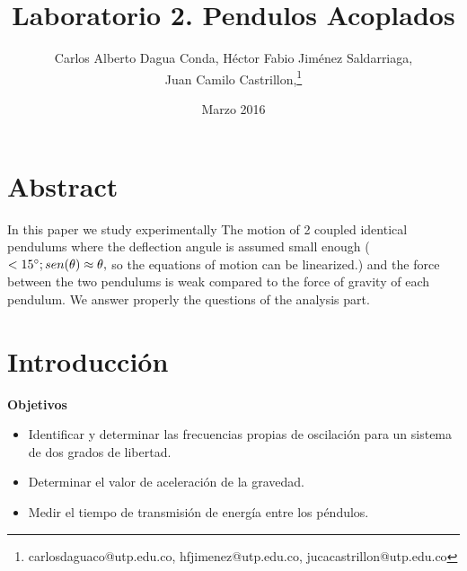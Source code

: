 \documentclass{article}
\title{Laboratorio 2. Pendulos Acoplados}
\author{Carlos Alberto Dagua Conda, Héctor Fabio Jiménez Saldarriaga, \\Juan Camilo Castrillon,\thanks{carlosdaguaco@utp.edu.co, hfjimenez@utp.edu.co, jucacastrillon@utp.edu.co} }
\date{Marzo 2016}
\begin{document}
\maketitle
\section{Abstract}
In this paper we study experimentally The motion of 2 coupled identical pendulums where the deflection angule is assumed small enough ($<15\degree;sen(\theta) \approx \theta,$ so the equations of motion can be linearized.) and the force between the two pendulums is weak compared to the force of gravity of each pendulum. We answer properly the questions of the analysis part.
\section{Introducción}
\textbf{Objetivos}
\begin{itemize}
\item Identificar y determinar las frecuencias propias de oscilación para un sistema de dos grados de libertad.
\item Determinar el valor de aceleración de la gravedad.
\item Medir el tiempo de transmisión de energía entre los péndulos.
\end{itemize}
\end{document}
